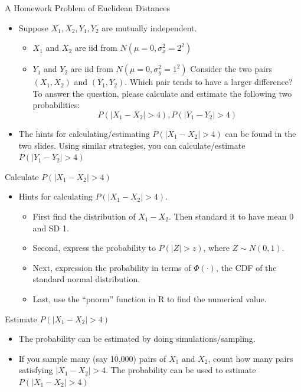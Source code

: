 \documentclass[
  ignorenonframetext,
]{beamer}
\providecommand{\tightlist}{%
  \setlength{\itemsep}{0pt}\setlength{\parskip}{0pt}}
\begin{document}
\begin{frame}{A Homework Problem of Euclidean Distances}
\protect\hypertarget{a-homework-problem-of-euclidean-distances}{}
\begin{itemize}
\tightlist
\item
  Suppose \(X_1, X_2, Y_1, Y_2\) are mutually independent.

  \begin{itemize}
  \tightlist
  \item
    \(X_1\) and \(X_2\) are iid from \(N(\mu=0, \sigma_x^2=2^2)\)
  \item
    \(Y_1\) and \(Y_2\) are iid from \(N(\mu=0, \sigma_y^2=1^2)\)
    Consider the two pairs \((X_1, X_2)\) and \((Y_1, Y_2)\). Which pair
    tends to have a larger difference? To answer the question, please
    calculate and estimate the following two probabilities:
    \[P(|X_1-X_2|>4), P(|Y_1-Y_2|>4)\]
  \end{itemize}
\item
  The hints for calculating/estimating \(P(|X_1-X_2|>4)\) can be found
  in the two slides. Using similar strategies, you can
  calculate/estimate \(P(|Y_1-Y_2|>4)\)
\end{itemize}
\end{frame}

\begin{frame}{Calculate \(P(|X_1-X_2|>4)\)}
\protect\hypertarget{calculate-px_1-x_24}{}
\begin{itemize}
\tightlist
\item
  Hints for calculating \(P(|X_1-X_2|>4)\).

  \begin{itemize}
  \tightlist
  \item
    First find the distribution of \(X_1-X_2\). Then standard it to have
    mean 0 and SD 1.
  \item
    Second, express the probability to \(P(|Z|>z)\), where
    \(Z\sim N(0,1)\).
  \item
    Next, expression the probability in terms of \(\Phi(\cdot)\), the
    CDF of the standard normal distribution.
  \item
    Last, use the ``pnorm'' function in R to find the numerical value.
  \end{itemize}
\end{itemize}
\end{frame}

\begin{frame}{Estimate \(P(|X_1-X_2|>4)\)}
\protect\hypertarget{estimate-px_1-x_24}{}
\begin{itemize}
\tightlist
\item
  The probability can be estimated by doing simulations/sampling.
\item
  If you sample many (say 10,000) pairs of \(X_1\) and \(X_2\), count
  how many pairs satisfying \(|X_1-X_2|>4\). The probability can be used
  to estimate \(P(|X_1-X_2|>4)\)
\end{itemize}
\end{frame}
\end{document}
